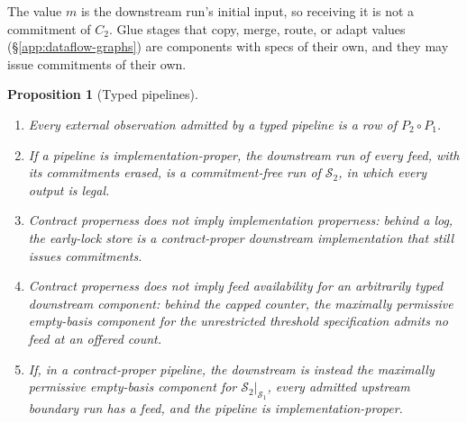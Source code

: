 \documentclass[sigconf]{cidr-2027}
\newtheorem{proposition}{Proposition}
\theoremstyle{remark}
\newcommand{\commitment}{commitment\xspace}
\newcommand{\commitments}{commitments\xspace}
\newcommand{\Spec}{\mathcal{S}}
\begin{document}
\color{blue!70!black}The value $m$ is the downstream run's initial input, so receiving it is not
a \commitment of $C_2$.  Glue stages that copy, merge, route, or adapt values
(\S\ref{app:dataflow-graphs}) are components with specs of
their own, and they may issue \commitments of their own.\color{black}

\begin{proposition}[Typed pipelines]
\label{prop:typed-pipelines}
\leavevmode
\begin{enumerate}
\item Every external observation admitted by a typed pipeline is a row of
      $P_2\circ P_1$.
\item If a pipeline is implementation-proper, the downstream run of every
      feed, with its \commitments erased, is a \commitment-free run of
      $\Spec_2$, in which every output is legal.
\item Contract properness does not imply implementation properness: behind a
      log, the early-lock store is a contract-proper downstream
      implementation that still issues \commitments.
\item Contract properness does not imply feed availability for an
      arbitrarily typed downstream component: behind the capped counter, the
      maximally permissive empty-basis component for the unrestricted
      threshold specification admits no feed at an offered count.
\item If, in a contract-proper pipeline, the downstream is instead the
      maximally permissive empty-basis component for $\Spec_2|_{\Spec_1}$,
      every admitted upstream boundary run has a feed, and the pipeline is
      implementation-proper.
\end{enumerate}
\end{proposition}
\end{document}
